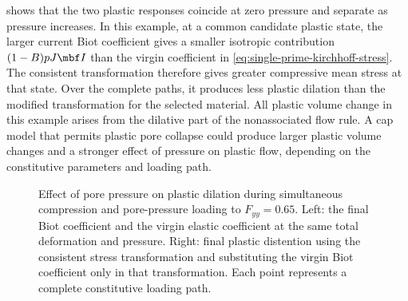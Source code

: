  shows that the two plastic responses
coincide at zero pressure and separate as pressure increases.  In this example,
at a common candidate plastic state, the larger current Biot coefficient gives a
smaller isotropic contribution \((1-B)pJ\mbf I\) than the virgin coefficient
in \eqref{eq:single-prime-kirchhoff-stress}.  The consistent transformation
therefore gives greater compressive mean stress at that state.  Over the
complete paths, it produces less plastic dilation than the modified
transformation for the selected material.  All plastic volume change in this
example arises from the dilative part of the nonassociated flow rule.
A cap model that permits plastic pore collapse could produce larger plastic
volume changes and a stronger effect of pressure on plastic flow, depending
on the constitutive
parameters and loading path.

\begin{figure}[ht]
 \centering
 \caption{Effect of pore pressure on plastic dilation during simultaneous compression
 and pore-pressure loading to \(F_{yy}=0.65\).  Left: the final Biot coefficient and the virgin elastic
 coefficient at the same total deformation and pressure.  Right: final plastic
 distention using the consistent stress transformation and substituting the
 virgin Biot coefficient only in that transformation.  Each point
 represents a complete constitutive loading path.}
 \label{fig:implicit-poroplastic-feedback}
\end{figure}
\FloatBarrier
